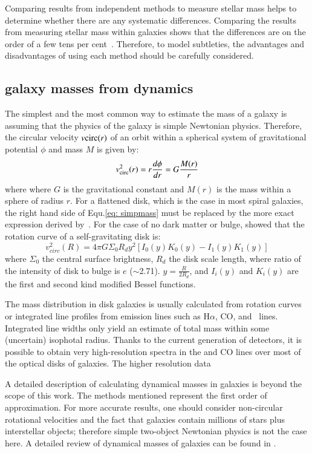 Comparing results from independent methods to measure stellar mass helps to determine whether there are any systematic differences.
Comparing the results from measuring stellar mass within galaxies shows that the differences are on the order of a few tens per cent~\citep{McLaughlin05}.
Therefore, to model subtleties, the advantages and disadvantages of using each method should be carefully considered. 


\subsection{galaxy masses from dynamics}

The simplest and the most common way to estimate the mass of a galaxy is assuming that the physics of the galaxy is simple Newtonian physics.
Therefore, the circular velocity $v{\rm circ}(r)$ of an orbit within a spherical system of gravitational potential $\phi$ and mass $M$ is given by:
\begin{equation}
\label{eq: simpmass}
v^2_{\rm circ}(r)=r\frac{d\phi}{dr} = G\frac{M(r)}{r}
\end{equation}
where where $G$ is the gravitational constant and $M(r)$ is the mass within a sphere of radius $r$. 
For a flattened disk, which is the case in most spiral galaxies, the right hand side of Equ.\ref{eq: simpmass} must be replaced by the more exact expression derived by~\cite{Freeman70}. 
For the case of no dark matter or bulge, \cite{Freeman70} showed that the rotation curve of a self-gravitating disk is:
\begin{equation}
v^2_{circ}(R)= 4\pi G \Sigma_{0}R_{d} y^2[I_0(y)K_0(y) - I_1(y)K_1(y)]
\end{equation}
where $\Sigma_0$ the central surface brightness, $R_d$ the disk scale length, where ratio of the intensity of disk to bulge is $e$ ($\sim$2.71).  
$y=\frac{R}{2R_d}$, and $I_i(y)$ and $K_i(y)$ are the first and second kind modified Bessel functions. 


The mass distribution in disk galaxies is usually calculated from rotation curves or integrated line profiles from emission lines such as H${\alpha}$, CO, and \hi~lines. 
Integrated line widths only yield an estimate of total mass within some (uncertain) isophotal radius.
Thanks to the current generation of detectors, it is possible to obtain very high-resolution spectra in the \halpha and CO lines over most of the optical disks of galaxies.
The higher resolution data 

A detailed description of calculating dynamical masses in galaxies is beyond the scope of this work. 
The methods mentioned represent the first order of approximation. 
For more accurate results, one should consider non-circular rotational velocities and the fact that galaxies contain millions of stars plus interstellar objects; therefore simple two-object Newtonian physics is not the case here. 
A detailed review of dynamical masses of galaxies can be found in \citet{Courteau13}.

